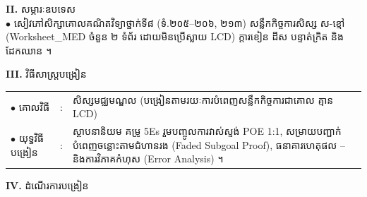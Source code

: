 \documentclass[a4paper,10pt]{article}
\newcommand{\en}[1]{{\TimesEn #1}}
\newcommand{\cnum}[1]{{\fontsize{10.5pt}{12pt}\selectfont\ding{\numexpr181+#1\relax}}\hspace{0.2em}}
\begin{document}
{\vspace{2pt}

\textbf{II.} {\muol សម្ភារៈឧបទេស}\\[1pt]
\hspace*{0.55cm}$\bullet$ \hspace{0.35cm} សៀវភៅសិក្សាគោលគណិតវិទ្យាថ្នាក់ទី៨ (ទំ.២០៥--២០៦, ២១៣) សន្លឹកកិច្ចការសិស្ស ស-ខ្មៅ (\en{Worksheet\_MED} ចំនួន ២ ទំព័រ ដោយមិនប្រើស្លាយ \en{LCD}) ក្ដារខៀន ដីស បន្ទាត់ក្រិត និងដែកឈាន ។

\vspace{2pt}

\textbf{III.} {\muol វិធីសាស្រ្តបង្រៀន}\\[1pt]
\hspace*{0.45cm}%
\begin{tabular}{@{}l l L{14.85cm}@{}}
  $\bullet$ \hspace{0.25cm} គោលវិធី & : & សិស្សមជ្ឈមណ្ឌល (បង្រៀនតាមរយៈការបំពេញសន្លឹកកិច្ចការជាគោល គ្មាន \en{LCD}) \\
  $\bullet$ \hspace{0.25cm} យុទ្ធវិធីបង្រៀន & : & ស្ថាបនានិយម គម្រូ \en{5Es} រួមបញ្ចូលការវាស់ស្ទង់ \en{POE 1:1}, សម្រាយបញ្ជាក់បំពេញចន្លោះតាមជំហានរង (\en{Faded Subgoal Proof}), ធនាគារហេតុផល \cnum{1}--\cnum{5} និងការវិភាគកំហុស (\en{Error Analysis}) ។ \\
\end{tabular}
}

\vspace{2pt}

\textbf{IV.} {\muol ដំណើរការបង្រៀន}

\vspace{1pt}
\end{document}
